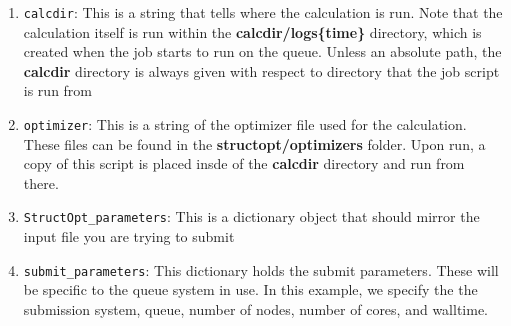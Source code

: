 \documentclass[11pt]{article}
\begin{document}
\begin{enumerate}
\item \texttt{calcdir}: This is a string that tells where the calculation is run. Note that the calculation itself is run within the \textbf{calcdir/logs\{time\}} directory, which is created when the job starts to run on the queue. Unless an absolute path, the \textbf{calcdir} directory is always given with respect to directory that the job script is run from

\item \texttt{optimizer}: This is a string of the optimizer file used for the calculation. These files can be found in the \textbf{structopt/optimizers} folder. Upon run, a copy of this script is placed insde of the \textbf{calcdir} directory and run from there.

\item \texttt{StructOpt\_parameters}: This is a dictionary object that should mirror the input file you are trying to submit

\item \texttt{submit\_parameters}: This dictionary holds the submit parameters. These will be specific to the queue system in use. In this example, we specify the the submission system, queue, number of nodes, number of cores, and walltime.
\end{enumerate}
\end{document}
